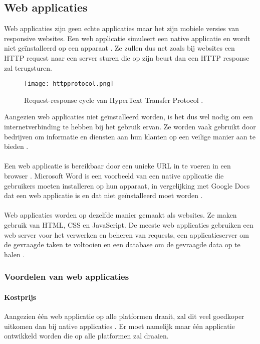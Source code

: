 \subsection{Web applicaties}
Web applicaties zijn geen echte applicaties maar het zijn mobiele versies van responsive websites. 
Een web applicatie simuleert een native applicatie en wordt niet geïnstalleerd op een 
apparaat \autocite{Beeproger2023}. Ze zullen dus net zoals bij websites een HTTP request naar 
een server sturen die op zijn beurt dan een HTTP response zal terugsturen.
\begin{figure}[H]
    \centering
    \texttt{[image: httpprotocol.png]}
    \caption{Request-response cycle van HyperText Transfer Protocol \parencite{Hartl2019}.}
\end{figure}
Aangezien web applicaties niet geïnstalleerd worden, is het dus wel nodig om een internetverbinding 
te hebben bij het gebruik ervan. Ze worden vaak gebruikt door bedrijven om informatie en diensten 
aan hun klanten op een veilige manier aan te bieden \autocite{Nehra2023}. 
\\\\
Een web applicatie is bereikbaar door een unieke URL in te voeren in een browser 
\autocite{Beeproger2023}. Microsoft Word is een voorbeeld van een native applicatie die 
gebruikers moeten installeren op hun apparaat, in vergelijking met Google Docs dat een web applicatie 
is en dat niet geïnstalleerd moet worden \autocite{Nehra2023}.
\\\\
Web applicaties worden op dezelfde manier gemaakt als websites. Ze maken gebruik van HTML, CSS en JavaScript. 
De meeste web applicaties gebruiken een web server voor het verwerken en beheren van requests, een 
applicatieserver om de gevraagde taken te voltooien en een database om de gevraagde data 
op te halen \autocite{Varsha2023}.

\subsubsection{Voordelen van web applicaties}\label{ch:VoordelenWebApplicaties}
\paragraph{Kostprijs}
Aangezien één web applicatie op alle platformen draait, zal dit veel goedkoper uitkomen dan bij native 
applicaties \autocite{Laarhoven2021}. Er moet namelijk maar één applicatie ontwikkeld worden die op alle 
platformen zal draaien.

